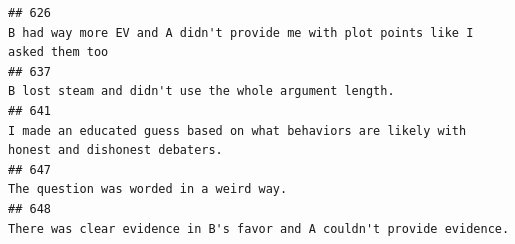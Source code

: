 \documentclass[
]{article}
\begin{document}
\begin{verbatim}
## 626                                                                                                                                                                                                                                                                                                                                                                                                                                                                                                                   B had way more EV and A didn't provide me with plot points like I asked them too
## 637                                                                                                                                                                                                                                                                                                                                                                                                                                                                                                                                             B lost steam and didn't use the whole argument length.
## 641                                                                                                                                                                                                                                                                                                                                                                                                                                                                                                    I made an educated guess based on what behaviors are likely with honest and dishonest debaters.
## 647                                                                                                                                                                                                                                                                                                                                                                                                                                                                                                                                                            The question was worded in a weird way.
## 648                                                                                                                                                                                                                                                                                                                                                                                                                                                                                                                             There was clear evidence in B's favor and A couldn't provide evidence.

\end{verbatim}
\end{document}
